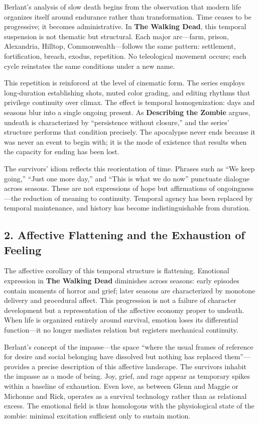 \documentclass[11pt]{article}
\begin{document}
Berlant’s analysis of slow death begins from the observation that modern life organizes itself around endurance rather than transformation.  Time ceases to be progressive; it becomes administrative.  In \textbf{The Walking Dead}, this temporal suspension is not thematic but structural.  Each major arc—farm, prison, Alexandria, Hilltop, Commonwealth—follows the same pattern: settlement, fortification, breach, exodus, repetition.  No teleological movement occurs; each cycle reinstates the same conditions under a new name.  

This repetition is reinforced at the level of cinematic form.  The series employs long-duration establishing shots, muted color grading, and editing rhythms that privilege continuity over climax.  The effect is temporal homogenization: days and seasons blur into a single ongoing present.  As \textbf{Describing the Zombie} argues, undeath is characterized by “persistence without closure,” and the series’ structure performs that condition precisely.  The apocalypse never ends because it was never an event to begin with; it is the mode of existence that results when the capacity for ending has been lost.  

The survivors’ idiom reflects this reorientation of time.  Phrases such as “We keep going,” “Just one more day,” and “This is what we do now” punctuate dialogue across seasons.  These are not expressions of hope but affirmations of ongoingness—the reduction of meaning to continuity.  Temporal agency has been replaced by temporal maintenance, and history has become indistinguishable from duration.
\subsection*{2. Affective Flattening and the Exhaustion of Feeling}
\label{sec:orgdbf22a4}

The affective corollary of this temporal structure is flattening.  Emotional expression in \textbf{The Walking Dead} diminishes across seasons: early episodes contain moments of horror and grief; later seasons are characterized by monotone delivery and procedural affect.  This progression is not a failure of character development but a representation of the affective economy proper to undeath.  When life is organized entirely around survival, emotion loses its differential function—it no longer mediates relation but registers mechanical continuity.  

Berlant’s concept of the impasse—the space “where the usual frames of reference for desire and social belonging have dissolved but nothing has replaced them”—provides a precise description of this affective landscape.  The survivors inhabit the impasse as a mode of being.  Joy, grief, and rage appear as temporary spikes within a baseline of exhaustion.  Even love, as between Glenn and Maggie or Michonne and Rick, operates as a survival technology rather than as relational excess.  The emotional field is thus homologous with the physiological state of the zombie: minimal excitation sufficient only to sustain motion.  
\end{document}
